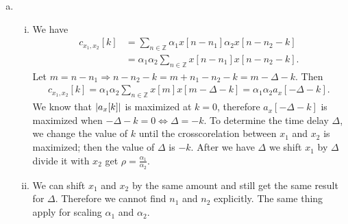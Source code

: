 \begin{enumerate}[(a)]
\begin{enumerate}[i.]
	\item 
\end{enumerate}

\item 
\begin{enumerate}[i.]
	\item We have
	\begin{align*}
	c_{x_1, x_2}[k]
	&= \sum_{n \in \mathbb{Z}} \alpha_1 x[n - n_1] \alpha_2 x[n - n_2 - k] \\
	&= \alpha_1 \alpha_2 \sum_{n \in \mathbb{Z}} x[n - n_1] x[n - n_2 - k].
	\end{align*}
	Let $m = n - n_1 \Rightarrow n - n_2 - k = m + n_1 - n_2 - k = m - \Delta - k$. Then
	\begin{align*}
	c_{x_1, x_2}[k] = \alpha_1 \alpha_2 \sum_{n \in \mathbb{Z}} x[m] x[m - \Delta - k] = \alpha_1 \alpha_2 a_x[-\Delta - k].
	\end{align*}
	We know that $\left\lvert a_x[k] \right\rvert$ is maximized at $k = 0$, therefore $a_x[-\Delta -k]$ is maximized when $-\Delta - k = 0 \Leftrightarrow \Delta = - k$. To determine the time delay $\Delta$, we change the value of $k$ until the crosscorelation between $x_1$ and $x_2$ is maximized; then the value of $\Delta$ is $-k$. After we have $\Delta$ we shift $x_1$ by $\Delta$ divide it with $x_2$ get $\rho = \frac{\alpha_1}{\alpha_2}$.
	
	\item We can shift $x_1$ and $x_2$ by the same amount and still get the same result for $\Delta$. Therefore we cannot find $n_1$ and $n_2$ explicitly. The same thing apply for scaling $\alpha_1$ and $\alpha_2$.
\end{enumerate}
\end{enumerate}